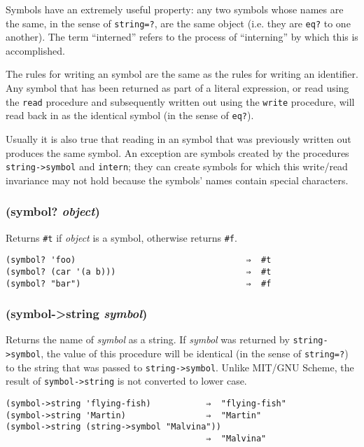 \documentclass{article}
\begin{document}
Symbols have an extremely useful property: any two symbols whose names are the same, in the
sense of \verb|string=?|, are the same object (i.e. they are \verb|eq?| to one another).
The term ``interned'' refers to the process of ``interning'' by which this is accomplished.

The rules for writing an symbol are the same as the rules for writing an identifier. Any
symbol that has been returned as part of a literal expression, or read using the \verb|read|
procedure and subsequently written out using the \verb|write| procedure, will read back in
as the identical symbol (in the sense of \verb|eq?|).

Usually it is also true that reading in an symbol that was previously written out produces the
same symbol. An exception are symbols created by the procedures
\verb|string->symbol| and \verb|intern|; they can create symbols for which
this write/read invariance may not hold because the symbols' names contain special characters.

\subsubsection{(symbol? \emph{object})}

Returns \verb|#t| if \emph{object} is a symbol, otherwise returns \verb|#f|.

\begin{verbatim}
(symbol? 'foo)                                  ⇒  #t
(symbol? (car '(a b)))                          ⇒  #t
(symbol? "bar")                                 ⇒  #f
\end{verbatim}

\subsubsection{(symbol-\textgreater{}string \emph{symbol})}

Returns the name of \emph{symbol} as a string. If \emph{symbol} was returned by
\verb|string->symbol|, the value of this procedure will be identical (in the
sense of \verb|string=?|) to the string that was passed to
\verb|string->symbol|. Unlike MIT/GNU Scheme, the result of
\verb|symbol->string| is not converted to lower case.

\begin{verbatim}
(symbol->string 'flying-fish)           ⇒  "flying-fish"
(symbol->string 'Martin)                ⇒  "Martin"
(symbol->string (string->symbol "Malvina"))
                                        ⇒  "Malvina"
\end{verbatim}
\end{document}
